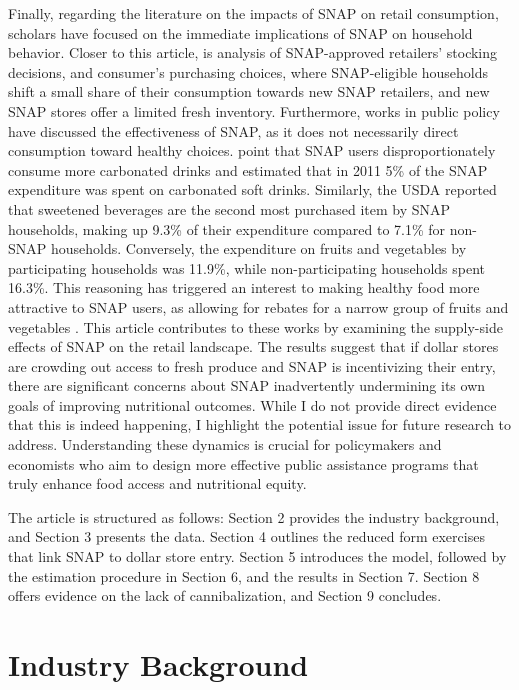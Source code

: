 \documentclass[11.5pt]{article}
\begin{document}
Finally, regarding the literature on the impacts of SNAP on retail consumption, scholars have focused on the immediate implications of SNAP on household behavior. Closer to this article,  is \citeauthor{byrne2022welfare} \citeyear{byrne2022welfare} analysis of SNAP-approved retailers' stocking decisions, and consumer's purchasing choices, where SNAP-eligible households shift a small share of their consumption towards new SNAP retailers, and new SNAP stores offer a limited fresh inventory. Furthermore, works in public policy have discussed the effectiveness of SNAP, as it does not necessarily direct consumption toward healthy choices. \citeauthor{shenkin2010using} \citeyear{shenkin2010using} point that SNAP users disproportionately consume more carbonated drinks and estimated that in 2011 5\% of the SNAP expenditure was spent on carbonated soft drinks. Similarly, the USDA \citeyear{usdareport} reported that sweetened beverages are the second most purchased item by SNAP households, making up 9.3\% of their expenditure compared to 7.1\% for non-SNAP households. Conversely, the expenditure on fruits and vegetables by participating households was 11.9\%, while non-participating households spent 16.3\%. This reasoning has triggered an interest to making healthy food more attractive to SNAP users, as allowing for rebates for a narrow group of fruits and vegetables \cite{schanzenbach2017pros}. This article contributes to these works by examining the supply-side effects of SNAP on the retail landscape. The results suggest that if dollar stores are crowding out access to fresh produce and SNAP is incentivizing their entry, there are significant concerns about SNAP inadvertently undermining its own goals of improving nutritional outcomes. While I do not provide direct evidence that this is indeed happening, I highlight the potential issue for future research to address. Understanding these dynamics is crucial for policymakers and economists who aim to design more effective public assistance programs that truly enhance food access and nutritional equity.


The article is structured as follows: Section 2 provides the industry background, and Section 3 presents the data. Section 4 outlines the reduced form exercises that link SNAP to dollar store entry. Section 5 introduces the model, followed by the estimation procedure in Section 6, and the results in Section 7. Section 8 offers evidence on the lack of cannibalization, and Section 9 concludes.

\section{Industry Background}
\end{document}
